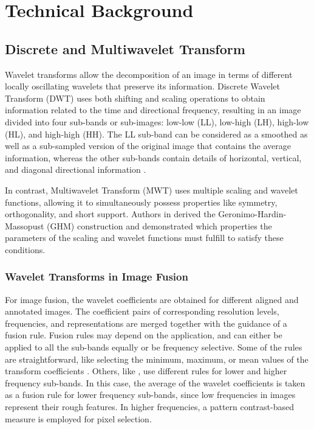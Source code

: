 \documentclass{article}
\begin{document}
\section{Technical Background}
\subsection{Discrete and Multiwavelet Transform}
\label{subsec:DWT_MWT}
Wavelet transforms allow the decomposition of an image in terms of different locally oscillating wavelets that preserve its information.
Discrete Wavelet Transform (DWT) uses both shifting and scaling operations to obtain information related to the time and directional frequency, resulting in an image divided into four sub-bands or sub-images: low-low (LL), low-high (LH), high-low (HL), and high-high (HH). The LL sub-band can be considered as a smoothed as well as a sub-sampled version of the original image that contains the average information, whereas the other sub-bands contain details of horizontal, vertical, and diagonal directional information \cite{M.Haribabu.2017, Pajares.Delacruz.2004}.

In contrast, Multiwavelet Transform (MWT) uses multiple scaling and wavelet functions, allowing it to simultaneously possess properties like symmetry, orthogonality, and short support. Authors in \cite{Geronimo.1994} derived the Geronimo-Hardin-Massopust (GHM) construction and demonstrated which properties the parameters of the scaling and wavelet functions must fulfill to satisfy these conditions.

\subsubsection{Wavelet Transforms in Image Fusion}
For image fusion, the wavelet coefficients are obtained for different aligned and annotated images.
The coefficient pairs of corresponding resolution levels, frequencies, and representations are merged together with the guidance of a fusion rule. Fusion rules may depend on the application, and can either be applied to all the sub-bands equally or be frequency selective. Some of the rules are straightforward, like selecting the minimum, maximum, or mean values of the transform coefficients \cite{Pajares.Delacruz.2004, Chiorean.Vaida.2009}. Others, like \cite{Wang2004}, use different rules for lower and higher frequency sub-bands. In this case, the average of the wavelet coefficients is taken as a fusion rule for lower frequency sub-bands, since low frequencies in images represent their rough features. In higher frequencies, a pattern contrast-based measure is employed for pixel selection.
\end{document}
